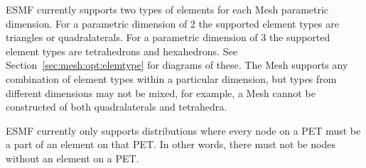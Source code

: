 ESMF currently supports two types of elements for each Mesh parametric dimension. For a parametric dimension of 2 the 
supported element types are triangles or quadralaterals. For a parametric dimension of 3 the supported element types are tetrahedrons
and hexahedrons. See Section~\ref{sec:mesh:opt:elemtype} for diagrams of these. The Mesh supports any combination of element types within a particular
dimension, but types from different dimensions may not be mixed, for example, a Mesh cannot be constructed of both quadralaterals and tetrahedra.

ESMF currently only supports distributions where every node on a PET must be a part of an element on that PET. In other words, there 
must not be nodes without an element on a PET. 

